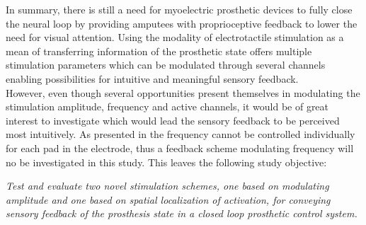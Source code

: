 

In summary, there is still a need for myoelectric prosthetic devices to fully close the neural loop by providing amputees with proprioceptive feedback to lower the need for visual attention. Using the modality of electrotactile stimulation as a mean of transferring information of the prosthetic state offers multiple stimulation parameters which can be modulated through several channels enabling possibilities for intuitive and meaningful sensory feedback. \\
However, even though several opportunities present themselves in modulating the stimulation amplitude, frequency and active channels, it would be of great interest to investigate which would lead the sensory feedback to be perceived most intuitively. As presented in  the frequency cannot be controlled individually for each pad in the electrode, thus a feedback scheme modulating frequency will no be investigated in this study. This leaves the following study objective: 

\begin{center}
	\textit{Test and evaluate two novel stimulation schemes, one based on modulating amplitude and one based on spatial localization of activation, for conveying sensory feedback of the prosthesis state in a closed loop prosthetic control system.}  
\end{center} 
